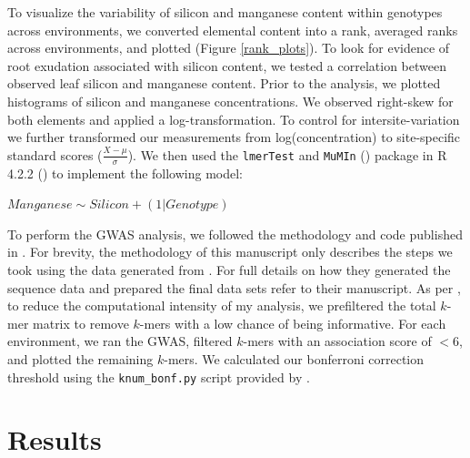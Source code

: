 \documentclass[12pt, letterpaper, ]{report}
\begin{document}
To visualize the variability of silicon and manganese content within genotypes across environments, we converted elemental content into a rank, averaged ranks across environments, and plotted (Figure \ref{rank_plots}). 
To look for evidence of root exudation associated with silicon content, we tested a correlation between observed leaf silicon and manganese content. Prior to the analysis, we plotted histograms of silicon and manganese concentrations. We observed right-skew for both elements and applied a log-transformation. To control for intersite-variation we further transformed our measurements from log(concentration) to site-specific standard scores ($\frac{X - \mu}{\sigma}$). We then used the \verb|lmerTest| and \verb|MuMIn| (\cite{kuznetsova_2017_lmerTest,barton_2023_mumin}) package in R 4.2.2 (\cite{r_core_team_2022}) to implement the following model: 

$Manganese \sim Silicon + (1|Genotype)$

To perform the GWAS analysis, we followed the methodology and code published in \textcite{gaurav_population_2022}. For brevity, the methodology of this manuscript only describes the steps we took using the data generated from \textcite{gaurav_population_2022}. For full details on how they generated the sequence data and prepared the final data sets refer to their manuscript. As per \textcite{gaurav_population_2022}, to reduce the computational intensity of my analysis, we prefiltered the total $k$-mer matrix to remove $k$-mers with a low chance of being informative. For each environment, we ran the GWAS, filtered $k$-mers with an association score of $<6$, and plotted the remaining $k$-mers. We calculated our bonferroni correction threshold using the \verb|knum_bonf.py| script provided by \textcite{gaurav_population_2022}. 

\section{Results}
\end{document}
